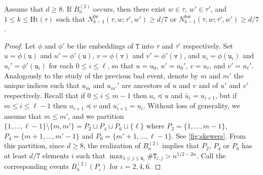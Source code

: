 \documentclass[11pt,reqno]{amsart}
\newcommand{\1}{\mathbf{1}}
\newcommand{\0}{\mathbf{0}}
\newcommand{\ttT}{\mathtt{T}}
\newcommand{\ttk}{\mathtt{k}}
\newcommand{\ttu}{\mathtt{u}}
\newcommand{\ttv}{\mathtt{v}}
\newcommand{\Ht}{\mathrm{Ht}}
\newcommand{\fw}{\mathrm{fw}}
\newcommand{\bw}{\mathrm{bw}}
\begin{document}
\begin{lem}
\label{deter-lemma:no_skewers}
Assume that $d\geq 8$. If $B_n^{(2)}$ occurs, then there exist $w \in \tau$, $w' \in \tau'$, and $1 \leq k \leq \Ht(\tau)$ such that $N_{k-1}^{\fw}(\tau,w;\tau',w')\geq d/7$ or $N_{k-1}^{\bw}(\tau,w;\tau',w')\geq d/7$.
\end{lem}

\begin{proof}
Let $\phi$ and $\phi'$ be the embeddings of $\ttT$ into $\tau$ and $\tau'$ respectively. Set $u=\phi(\ttu)$ and $u'=\phi'(\ttu)$, $v=\phi(\ttv)$ and $v'=\phi'(\ttv)$, and $u_i=\phi(\ttu_i)$ and $u_i'=\phi'(\ttu_i)$ for each $0\leq i\leq \ell$, so that $u=u_0$, $u'=u_0'$, $v=u_\ell$, and $v'=u_\ell'$. Analogously to the study of the previous bad event, denote by $m$ and $m'$ the unique indices such that $u_m$ and $u_{m'}'$ are ancestors of $u$ and $v$ and of $u'$ and $v'$ respectively. Recall that if $0\leq i\leq m-1$ then $u_i\preceq u$ and $\overleftarrow{u_i}=u_{i+1}$, but if $m\leq i\leq \ell-1$ then $u_{i+1}\preceq v$ and $\overleftarrow{u_{i+1}}=u_i$. Without loss of generality, we assume that $m \leq m'$, and we partition $\{1, \dots, \ell-1\}\setminus \{m,m'\} = P_2 \sqcup P_4 \sqcup P_6 \sqcup \{\ell\}$ where $P_2 = \{1, \dots, m-1\}$, $P_4 = \{m+1, \dots, m'-1\}$ and $P_6 = \{m'+1, \dots, \ell-1\}$. See \cref{fig:skewers}. From this partition, since $d\ge 8$, the realization of $B_n^{(2)}$ implies that $P_2$, $P_4$ or $P_6$ has at least $d/7$ elements $i$ such that $\max_{1\leq j\leq \ttk_i}\#\ttT_{i,j}>n^{1/2-2\alpha}$. Call the corresponding events $B_n^{(2)}(P_\iota)$ for $\iota=2,4,6$.


\end{proof}
\end{document}
